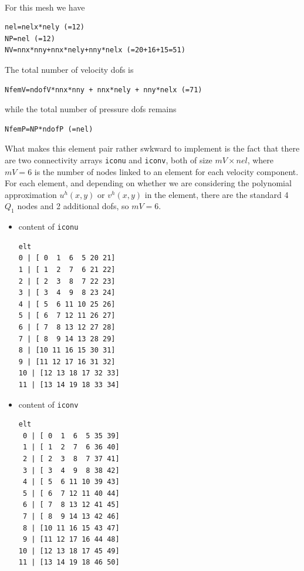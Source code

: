 \begin{center}
\\
\end{center}

For this mesh we have 

\begin{lstlisting}
nel=nelx*nely (=12) 
NP=nel (=12)
NV=nnx*nny+nnx*nely+nny*nelx (=20+16+15=51)
\end{lstlisting}

The total number of velocity dofs is 
\begin{lstlisting}
NfemV=ndofV*nnx*nny + nnx*nely + nny*nelx (=71)
\end{lstlisting}
while the total number of pressure dofs remains
\begin{lstlisting}
NfemP=NP*ndofP (=nel) 
\end{lstlisting}

What makes this element pair rather swkward to implement is the fact that 
there are two connectivity arrays {\tt iconu} and {\tt iconv}, both of size $mV\times nel$, where 
$mV=6$ is the number of nodes linked to an element for each velocity component. 
For each element, and depending on whether we are considering 
the polynomial approximation $u^h(x,y)$ or $v^h(x,y)$ in the element, there are the standard 4 $Q_1$ nodes and 2 additional 
dofs, so $mV=6$.
\begin{itemize}
\item content of {\tt iconu}
\begin{verbatim}
elt
0 | [ 0  1  6  5 20 21]
1 | [ 1  2  7  6 21 22]
2 | [ 2  3  8  7 22 23]
3 | [ 3  4  9  8 23 24]
4 | [ 5  6 11 10 25 26]
5 | [ 6  7 12 11 26 27]
6 | [ 7  8 13 12 27 28]
7 | [ 8  9 14 13 28 29]
8 | [10 11 16 15 30 31]
9 | [11 12 17 16 31 32]
10 | [12 13 18 17 32 33]
11 | [13 14 19 18 33 34]
\end{verbatim}
\item content of {\tt iconv}
\begin{verbatim}
elt
 0 | [ 0  1  6  5 35 39]
 1 | [ 1  2  7  6 36 40]
 2 | [ 2  3  8  7 37 41]
 3 | [ 3  4  9  8 38 42]
 4 | [ 5  6 11 10 39 43]
 5 | [ 6  7 12 11 40 44]
 6 | [ 7  8 13 12 41 45]
 7 | [ 8  9 14 13 42 46]
 8 | [10 11 16 15 43 47]
 9 | [11 12 17 16 44 48]
10 | [12 13 18 17 45 49]
11 | [13 14 19 18 46 50]
\end{verbatim}
\end{itemize}

